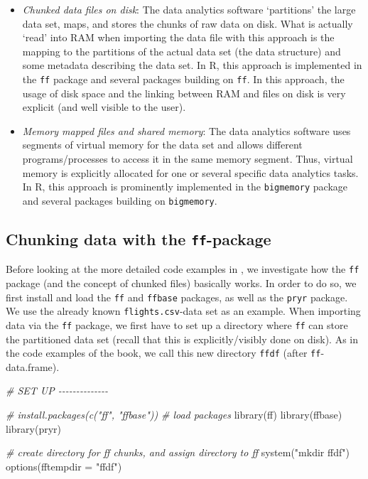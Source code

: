 \documentclass[
  12pt,
]{style/krantz}
\newenvironment{Shaded}{\begin{snugshade}}{\end{snugshade}}
\newcommand{\AttributeTok}[1]{\textcolor[rgb]{0.77,0.63,0.00}{#1}}
\newcommand{\CommentTok}[1]{\textcolor[rgb]{0.56,0.35,0.01}{\textit{#1}}}
\newcommand{\FunctionTok}[1]{\textcolor[rgb]{0.00,0.00,0.00}{#1}}
\newcommand{\NormalTok}[1]{#1}
\newcommand{\StringTok}[1]{\textcolor[rgb]{0.31,0.60,0.02}{#1}}
\begin{document}
\begin{itemize}
\item
  \emph{Chunked data files on disk}: The data analytics software `partitions' the large data set, maps, and stores the chunks of raw data on disk. What is actually `read' into RAM when importing the data file with this approach is the mapping to the partitions of the actual data set (the data structure) and some metadata describing the data set. In R, this approach is implemented in the \texttt{ff} package and several packages building on \texttt{ff}. In this approach, the usage of disk space and the linking between RAM and files on disk is very explicit (and well visible to the user).
\item
  \emph{Memory mapped files and shared memory}: The data analytics software uses segments of virtual memory for the data set and allows different programs/processes to access it in the same memory segment. Thus, virtual memory is explicitly allocated for one or several specific data analytics tasks. In R, this approach is prominently implemented in the \texttt{bigmemory} package and several packages building on \texttt{bigmemory}.
\end{itemize}

\hypertarget{chunking-data-with-the-ff-package}{%
\subsection{\texorpdfstring{Chunking data with the \texttt{ff}-package}{Chunking data with the ff-package}}\label{chunking-data-with-the-ff-package}}

Before looking at the more detailed code examples in \citet{walkowiak_2016}, we investigate how the \texttt{ff} package (and the concept of chunked files) basically works. In order to do so, we first install and load the \texttt{ff} and \texttt{ffbase} packages, as well as the \texttt{pryr} package. We use the already known \texttt{flights.csv}-data set as an example. When importing data via the \texttt{ff} package, we first have to set up a directory where \texttt{ff} can store the partitioned data set (recall that this is explicitly/visibly done on disk). As in the code examples of the book, we call this new directory \texttt{ffdf} (after \texttt{ff}-data.frame).

\begin{Shaded}
\begin{Highlighting}[]
\CommentTok{\# SET UP {-}{-}{-}{-}{-}{-}{-}{-}{-}{-}{-}{-}{-}{-}}

\CommentTok{\# install.packages(c("ff", "ffbase"))}
\CommentTok{\# load packages}
\FunctionTok{library}\NormalTok{(ff)}
\FunctionTok{library}\NormalTok{(ffbase)}
\FunctionTok{library}\NormalTok{(pryr)}

\CommentTok{\# create directory for ff chunks, and assign directory to ff }
\FunctionTok{system}\NormalTok{(}\StringTok{"mkdir ffdf"}\NormalTok{)}
\FunctionTok{options}\NormalTok{(}\AttributeTok{fftempdir =} \StringTok{"ffdf"}\NormalTok{)}
\end{Highlighting}
\end{Shaded}
\end{document}
